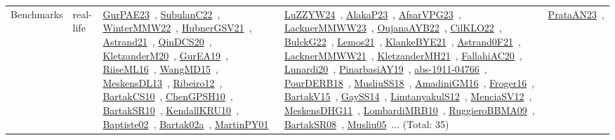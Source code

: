 {\begin{longtable}{lp{3cm}>{\raggedright\arraybackslash}p{6cm}>{\raggedright\arraybackslash}p{6cm}>{\raggedright\arraybackslash}p{8cm}}
\index{real-life}\index{Benchmarks!real-life}Benchmarks & real-life & \href{../works/GurPAE23.pdf}{GurPAE23}~\cite{GurPAE23}, \href{../works/SubulanC22.pdf}{SubulanC22}~\cite{SubulanC22}, \href{../works/WinterMMW22.pdf}{WinterMMW22}~\cite{WinterMMW22}, \href{../works/HubnerGSV21.pdf}{HubnerGSV21}~\cite{HubnerGSV21}, \href{../works/Astrand21.pdf}{Astrand21}~\cite{Astrand21}, \href{../works/QinDCS20.pdf}{QinDCS20}~\cite{QinDCS20}, \href{../works/KletzanderM20.pdf}{KletzanderM20}~\cite{KletzanderM20}, \href{../works/GurEA19.pdf}{GurEA19}~\cite{GurEA19}, \href{../works/RiiseML16.pdf}{RiiseML16}~\cite{RiiseML16}, \href{../works/WangMD15.pdf}{WangMD15}~\cite{WangMD15}, \href{../works/MeskensDL13.pdf}{MeskensDL13}~\cite{MeskensDL13}, \href{../works/Ribeiro12.pdf}{Ribeiro12}~\cite{Ribeiro12}, \href{../works/BartakCS10.pdf}{BartakCS10}~\cite{BartakCS10}, \href{../works/ChenGPSH10.pdf}{ChenGPSH10}~\cite{ChenGPSH10}, \href{../works/BartakSR10.pdf}{BartakSR10}~\cite{BartakSR10}, \href{../works/KendallKRU10.pdf}{KendallKRU10}~\cite{KendallKRU10}, \href{../works/Baptiste02.pdf}{Baptiste02}~\cite{Baptiste02}, \href{../works/Bartak02a.pdf}{Bartak02a}~\cite{Bartak02a}, \href{../works/MartinPY01.pdf}{MartinPY01}~\cite{MartinPY01} & \href{../works/LuZZYW24.pdf}{LuZZYW24}~\cite{LuZZYW24}, \href{../works/AlakaP23.pdf}{AlakaP23}~\cite{AlakaP23}, \href{../works/AfsarVPG23.pdf}{AfsarVPG23}~\cite{AfsarVPG23}, \href{../works/LacknerMMWW23.pdf}{LacknerMMWW23}~\cite{LacknerMMWW23}, \href{../works/OujanaAYB22.pdf}{OujanaAYB22}~\cite{OujanaAYB22}, \href{../works/CilKLO22.pdf}{CilKLO22}~\cite{CilKLO22}, \href{../works/BulckG22.pdf}{BulckG22}~\cite{BulckG22}, \href{../works/Lemos21.pdf}{Lemos21}~\cite{Lemos21}, \href{../works/KlankeBYE21.pdf}{KlankeBYE21}~\cite{KlankeBYE21}, \href{../works/Astrand0F21.pdf}{Astrand0F21}~\cite{Astrand0F21}, \href{../works/LacknerMMWW21.pdf}{LacknerMMWW21}~\cite{LacknerMMWW21}, \href{../works/KletzanderMH21.pdf}{KletzanderMH21}~\cite{KletzanderMH21}, \href{../works/FallahiAC20.pdf}{FallahiAC20}~\cite{FallahiAC20}, \href{../works/Lunardi20.pdf}{Lunardi20}~\cite{Lunardi20}, \href{../works/PinarbasiAY19.pdf}{PinarbasiAY19}~\cite{PinarbasiAY19}, \href{../works/abs-1911-04766.pdf}{abs-1911-04766}~\cite{abs-1911-04766}, \href{../works/PourDERB18.pdf}{PourDERB18}~\cite{PourDERB18}, \href{../works/MusliuSS18.pdf}{MusliuSS18}~\cite{MusliuSS18}, \href{../works/AmadiniGM16.pdf}{AmadiniGM16}~\cite{AmadiniGM16}, \href{../works/Froger16.pdf}{Froger16}~\cite{Froger16}, \href{../works/BartakV15.pdf}{BartakV15}~\cite{BartakV15}, \href{../works/GaySS14.pdf}{GaySS14}~\cite{GaySS14}, \href{../works/LimtanyakulS12.pdf}{LimtanyakulS12}~\cite{LimtanyakulS12}, \href{../works/MenciaSV12.pdf}{MenciaSV12}~\cite{MenciaSV12}, \href{../works/MeskensDHG11.pdf}{MeskensDHG11}~\cite{MeskensDHG11}, \href{../works/LombardiMRB10.pdf}{LombardiMRB10}~\cite{LombardiMRB10}, \href{../works/RuggieroBBMA09.pdf}{RuggieroBBMA09}~\cite{RuggieroBBMA09}, \href{../works/BartakSR08.pdf}{BartakSR08}~\cite{BartakSR08}, \href{../works/Musliu05.pdf}{Musliu05}~\cite{Musliu05}... (Total: 35) & \href{../works/PrataAN23.pdf}{PrataAN23}~\cite{PrataAN23}, 
\end{longtable}}
